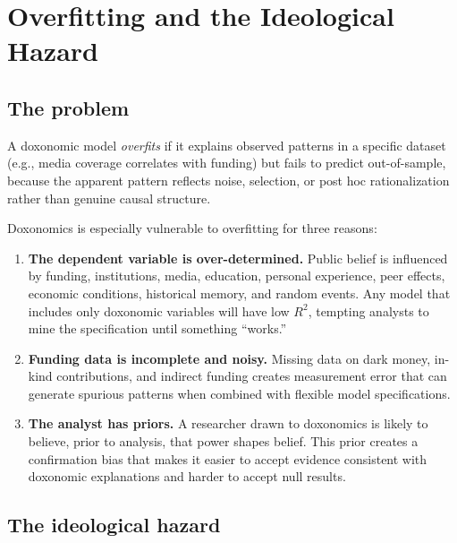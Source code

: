 \section{Overfitting and the Ideological Hazard}
\label{sec:ch20-overfitting}

\subsection{The problem}

\begin{definition}
\label{def:overfitting}
A doxonomic model \emph{overfits} if it explains observed patterns in a specific dataset (e.g., media coverage correlates with funding) but fails to predict out-of-sample, because the apparent pattern reflects noise, selection, or post hoc rationalization rather than genuine causal structure.
\end{definition}

Doxonomics is especially vulnerable to overfitting for three reasons:

\begin{enumerate}
  \item \textbf{The dependent variable is over-determined.}
  Public belief is influenced by funding, institutions, media, education, personal experience, peer effects, economic conditions, historical memory, and random events.
  Any model that includes only doxonomic variables will have low $R^2$, tempting analysts to mine the specification until something ``works.''

  \item \textbf{Funding data is incomplete and noisy.}
  Missing data on dark money, in-kind contributions, and indirect funding creates measurement error that can generate spurious patterns when combined with flexible model specifications.

  \item \textbf{The analyst has priors.}
  A researcher drawn to doxonomics is likely to believe, prior to analysis, that power shapes belief.
  This prior creates a confirmation bias that makes it easier to accept evidence consistent with doxonomic explanations and harder to accept null results.
\end{enumerate}

\subsection{The ideological hazard}

